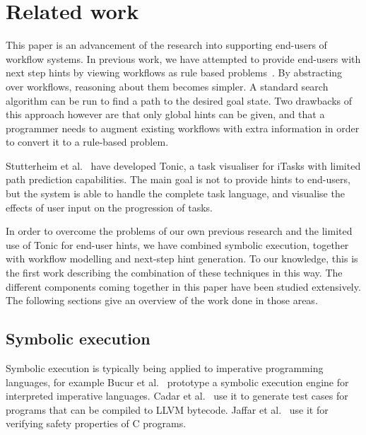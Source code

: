 
\section{Related work}
\label{sec:relatedwork}

This paper is an advancement of the research into supporting end-users of workflow systems.
In previous work, we have attempted to provide end-users with next step hints by viewing workflows as rule based problems~\cite{DBLP:conf/sfp/NausJ16}.
By abstracting over workflows, reasoning about them becomes simpler.
A standard search algorithm can be run to find a path to the desired goal state.
Two drawbacks of this approach however are that only global hints can be given, and that a programmer needs to augment existing workflows with extra information in order to convert it to a rule-based problem.

Stutterheim et al.~\cite{DBLP:conf/sfp/StutterheimPA14} have developed Tonic, a task visualiser for iTasks with limited path prediction capabilities.
The main goal is not to provide hints to end-users, but the system is able to handle the complete task language, and visualise the effects of user input on the progression of tasks.

In order to overcome the problems of our own previous research and the limited use of Tonic for end-user hints, we have combined symbolic execution, together with workflow modelling and next-step hint generation.
To our knowledge, this is the first work describing the combination of these techniques in this way.
The different components coming together in this paper have been studied extensively.
The following sections give an overview of the work done in those areas.

\subsection{Symbolic execution}


Symbolic execution \cite{King1975,Boyer1975} is typically being applied to imperative programming languages, for example Bucur et al.~\cite{BucurKC2014} prototype a symbolic execution engine for interpreted imperative languages.
Cadar et al.~\cite{CadarDE2008} use it to generate test cases for programs that can be compiled to LLVM bytecode.
Jaffar et al.~\cite{JaffarMNS2012} use it for verifying safety properties of C programs.


